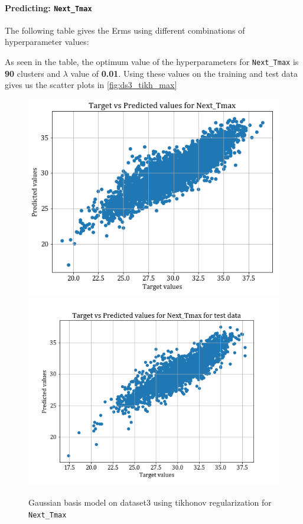 \documentclass[12pt,a4paper]{article}
\def\tt#1{\texttt{#1}}
\begin{document}
\paragraph{Predicting: \tt{Next\_Tmax}}
The following table gives the Erms using different combinations of hyperparameter values:


As seen in the table, the optimum value of the hyperparameters for  \tt{Next\_Tmax} is \textbf{90} clusters and $\lambda$ value of \textbf{0.01}. Using these values on the training and test data gives us the scatter plots in \autoref{fig:ds3_tikh_max}
\begin{figure}
    \centering
    \includegraphics[scale = 0.4]{images/train_ds3_tikh_max.png}
    \includegraphics[scale = 0.4]{images/test_ds3_tikh_max.png}
    \caption{Gaussian basis model on dataset3 using tikhonov regularization for \tt{Next\_Tmax}}
    \label{fig:ds3_tikh_max}
\end{figure}
\end{document}
